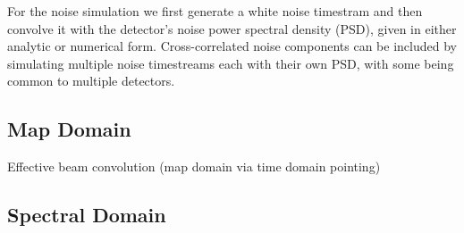 For the noise simulation we first generate a white noise timestram and then convolve it with the detector's noise power spectral density (PSD), given in either analytic or numerical form. Cross-correlated noise components can be included by simulating multiple noise timestreams each with their own PSD, with some being common to multiple detectors.


\subsection{Map Domain}

Effective beam convolution (map domain via time domain pointing)


\subsection{Spectral Domain}

%




